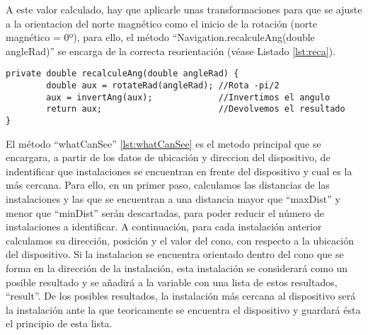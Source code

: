A este valor calculado, hay que aplicarle unas transformaciones para que se ajuste a la orientacion del norte magnético como el inicio de la rotación (norte magnético = 0º), para ello, el método ``Navigation.recalculeAng(double angleRad)'' se encarga de la correcta reorientación (véase Listado \ref{lst:reca}). 

\begin{lstlisting}[caption={Método que recalcula en ángulo para orientarlo en función del norte magnético.}, label={lst:reca}]
    private double recalculeAng(double angleRad) {
        double aux = rotateRad(angleRad); //Rota -pi/2
        aux = invertAng(aux);             //Invertimos el angulo 
        return aux;                       //Devolvemos el resultado
}   
\end{lstlisting}

El método ``whatCanSee'' \ref{lst:whatCanSee} es el metodo principal que se encargara, a partir de los datos de ubicación y direccion del dispositivo, de indentificar que instalaciones se encuentran en frente del dispositivo y cual es la más cercana. Para ello, en un primer paso, calculamos las distancias de las  instalaciones y las que se encuentran a una distancia mayor que ``maxDist'' y menor que ``minDist'' serán descartadas, para poder reducir el número de instalaciones a identificar. A continuación, para cada instalación anterior calculamos su dirección, posición y el valor del cono, con respecto a la ubicación del dispositivo. Si la instalacion se encuentra orientado dentro del cono que se forma en la dirección de la instalación, esta instalación se considerará como un posible resultado y se añadirá a la variable con una lista de estos resultados, ``result''. De los posibles resultados, la instalación más cercana al dispositivo será la instalación ante la que teoricamente se encuentra el dispositivo y guardará ésta el principio de esta lista.
 
